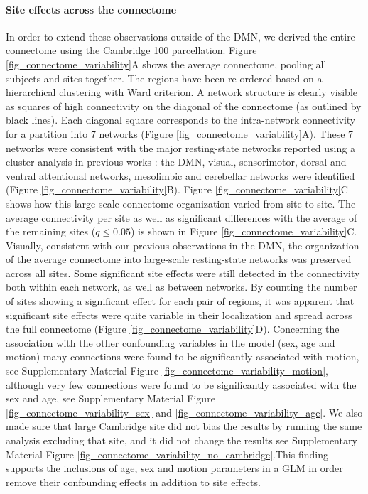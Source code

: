 \documentclass[authoryear]{elsarticle}
\begin{document}
\paragraph{Site effects across the connectome} In order to extend these
observations outside of the DMN, we derived the entire connectome using the
Cambridge 100 parcellation. Figure \ref{fig_connectome_variability}A shows the
average connectome, pooling all subjects and sites together. The regions have
been re-ordered based on a hierarchical clustering with Ward criterion. A
network structure is clearly visible as squares of high connectivity on the
diagonal of the connectome (as outlined by black lines). Each diagonal square
corresponds to the intra-network connectivity for a partition into 7 networks (Figure \ref{fig_connectome_variability}A). These 7 networks were
consistent with the major resting-state networks reported using a cluster
analysis in previous works \citep[e.g.][]{Heuvel2008, Bellec2010, Yeo2011,
Power2011}: the DMN, visual, sensorimotor, dorsal and ventral attentional
networks, mesolimbic and cerebellar networks were
identified (Figure \ref{fig_connectome_variability}B). Figure \ref{fig_connectome_variability}C shows how this large-scale
connectome organization varied from site to site. The average connectivity per
site as well as significant differences with the average of the remaining sites
($q\leq 0.05$) is shown in Figure \ref{fig_connectome_variability}C.
Visually, consistent with our previous observations in the DMN, the organization
of the average connectome into large-scale resting-state networks was preserved
across all sites. 
Some significant site effects were still detected in the connectivity both within each network, as well as between networks. By counting the number of sites showing a significant effect for each pair of regions, it was apparent that significant site effects were quite variable in their localization and spread across the full connectome (Figure \ref{fig_connectome_variability}D). 
Concerning the association with the other confounding variables in the model (sex, age and motion) many connections were found to be significantly associated with motion, see Supplementary Material Figure \ref{fig_connectome_variability_motion}, although very few connections were found to be significantly associated with the sex and age, see Supplementary Material Figure \ref{fig_connectome_variability_sex} and \ref{fig_connectome_variability_age}. We also made sure that large Cambridge site did not bias the results by running the same analysis excluding that site, and it did not change the results see Supplementary Material Figure \ref{fig_connectome_variability_no_cambridge}.This finding supports the inclusions of age, sex and motion parameters in a GLM in order remove their confounding effects in addition to site effects.
\end{document}

